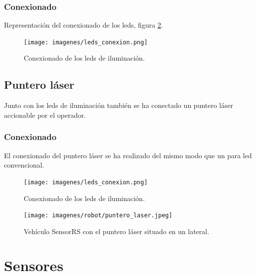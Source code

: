 \subsubsection{Conexionado}

Representación del conexionado de los leds, figura \ref{img:leds_conexiones}.\\

\begin{figure}[H]
  \begin{center}
   \texttt{[image: imagenes/leds\_conexion.png]}
  \end{center}
  \caption{Conexionado de los leds de iluminación.}
  \label{img:leds_conexiones}
\end{figure}


\subsection{Puntero láser}

Junto con los leds de iluminación también se ha conectado un puntero láser accionable por el operador.


\subsubsection{Conexionado}

El conexionado del puntero láser se ha realizado del mismo modo que un para led convencional.\\

\begin{figure}[H]
  \begin{center}
   \texttt{[image: imagenes/leds\_conexion.png]}
  \end{center}
  \caption{Conexionado de los leds de iluminación.}
  \label{img:leds_conexiones}
\end{figure}


\begin{figure}[H]
  \begin{center}
   \texttt{[image: imagenes/robot/puntero\_laser.jpeg]}
  \end{center}
  \caption{Vehículo SensorRS con el puntero láser situado en un lateral.}
  \label{vista-conexiones}
\end{figure}


\section{Sensores}

